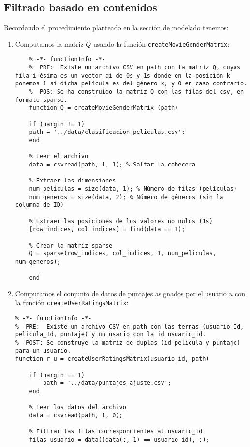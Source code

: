 \documentclass[12pt,a4paper]{article}
\begin{document}
\subsection*{Filtrado basado en contenidos}
Recordando el procedimiento planteado en la sección de modelado tenemos:
\begin{enumerate}
  \item Computamos la matriz \(Q\) usando la función \texttt{createMovieGenderMatrix}:
        \begin{lstlisting}
    % -*- functionInfo -*-
    %  PRE:  Existe un archivo CSV en path con la matriz Q, cuyas fila i-ésima es un vector qi de 0s y 1s donde en la posición k ponemos 1 si dicha película es del género k, y 0 en caso contrario.
    %  POS: Se ha construido la matriz Q con las filas del csv, en formato sparse.
    function Q = createMovieGenderMatrix (path)
    
    if (nargin != 1)
    path = '../data/clasificacion_peliculas.csv';
    end
    
    % Leer el archivo
    data = csvread(path, 1, 1); % Saltar la cabecera
    
    % Extraer las dimensiones
    num_peliculas = size(data, 1); % Número de filas (películas)
    num_generos = size(data, 2); % Número de géneros (sin la columna de ID)
    
    % Extraer las posiciones de los valores no nulos (1s)
    [row_indices, col_indices] = find(data == 1);
    
    % Crear la matriz sparse
    Q = sparse(row_indices, col_indices, 1, num_peliculas, num_generos);
    
    end
  \end{lstlisting}
  \item Computamos el conjunto de datos de puntajes asignados por el usuario \(u\) con la función \texttt{createUserRatingsMatrix}:
        \begin{lstlisting}
% -*- functionInfo -*-
%  PRE:  Existe un archivo CSV en path con las ternas (usuario_Id, pelicula_Id, puntaje) y un usario con la id usuario_id.
%  POST: Se construye la matriz de duplas (id película y puntaje) para un usuario.
function r_u = createUserRatingsMatrix(usuario_id, path)

    if (nargin == 1)
        path = '../data/puntajes_ajuste.csv';
    end

    % Leer los datos del archivo
    data = csvread(path, 1, 0);

    % Filtrar las filas correspondientes al usuario_id
    filas_usuario = data((data(:, 1) == usuario_id), :);


\end{lstlisting}
\end{enumerate}
\end{document}
